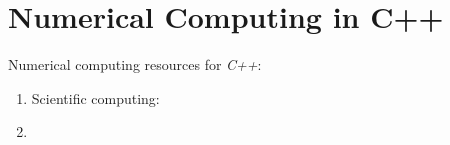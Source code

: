 \section{Numerical Computing in C++}
\label{sec:NumericalComputingInCpp}

Numerical computing resources for {\it C++}: \vspace{-0.3cm}
\begin{enumerate} \itemsep -4pt
\item Scientific computing: \cite{PittFrancis2012}
\item 
\end{enumerate}

















